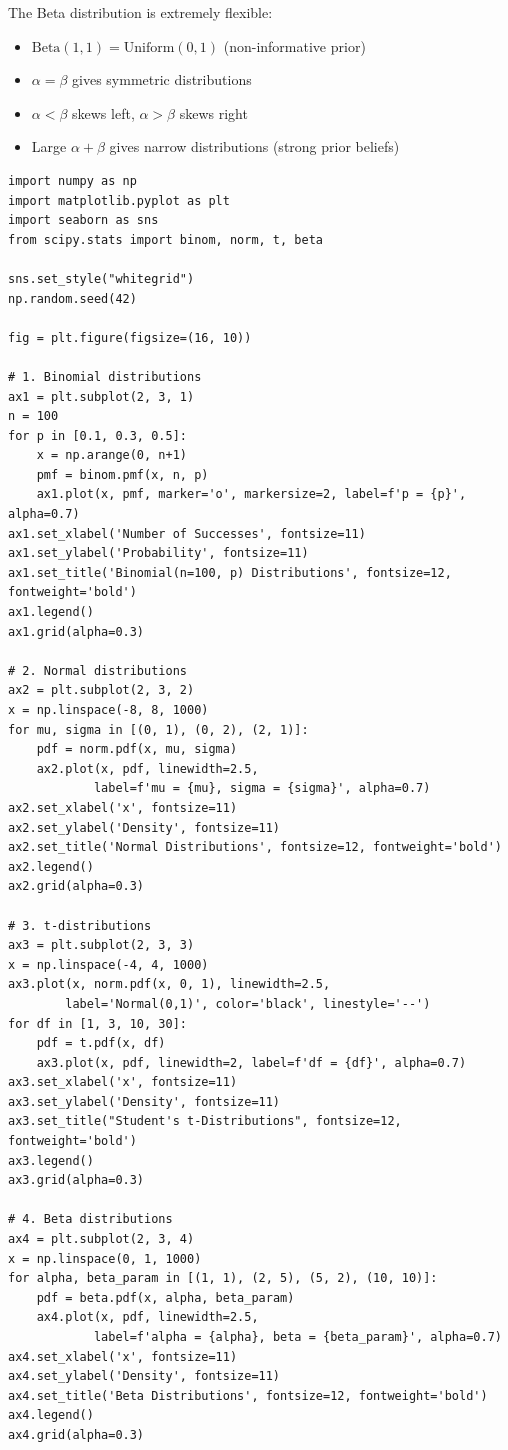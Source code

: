 The Beta distribution is extremely flexible:
\begin{itemize}
    \item $\text{Beta}(1,1) = \text{Uniform}(0,1)$ (non-informative prior)
    \item $\alpha = \beta$ gives symmetric distributions
    \item $\alpha < \beta$ skews left, $\alpha > \beta$ skews right
    \item Large $\alpha + \beta$ gives narrow distributions (strong prior beliefs)
\end{itemize}

\lstset{language=Python, caption=Visualizing Key Distributions, label=lst:distributions_viz}
\begin{lstlisting}
import numpy as np
import matplotlib.pyplot as plt
import seaborn as sns
from scipy.stats import binom, norm, t, beta

sns.set_style("whitegrid")
np.random.seed(42)

fig = plt.figure(figsize=(16, 10))

# 1. Binomial distributions
ax1 = plt.subplot(2, 3, 1)
n = 100
for p in [0.1, 0.3, 0.5]:
    x = np.arange(0, n+1)
    pmf = binom.pmf(x, n, p)
    ax1.plot(x, pmf, marker='o', markersize=2, label=f'p = {p}', alpha=0.7)
ax1.set_xlabel('Number of Successes', fontsize=11)
ax1.set_ylabel('Probability', fontsize=11)
ax1.set_title('Binomial(n=100, p) Distributions', fontsize=12, fontweight='bold')
ax1.legend()
ax1.grid(alpha=0.3)

# 2. Normal distributions
ax2 = plt.subplot(2, 3, 2)
x = np.linspace(-8, 8, 1000)
for mu, sigma in [(0, 1), (0, 2), (2, 1)]:
    pdf = norm.pdf(x, mu, sigma)
    ax2.plot(x, pdf, linewidth=2.5,
            label=f'mu = {mu}, sigma = {sigma}', alpha=0.7)
ax2.set_xlabel('x', fontsize=11)
ax2.set_ylabel('Density', fontsize=11)
ax2.set_title('Normal Distributions', fontsize=12, fontweight='bold')
ax2.legend()
ax2.grid(alpha=0.3)

# 3. t-distributions
ax3 = plt.subplot(2, 3, 3)
x = np.linspace(-4, 4, 1000)
ax3.plot(x, norm.pdf(x, 0, 1), linewidth=2.5,
        label='Normal(0,1)', color='black', linestyle='--')
for df in [1, 3, 10, 30]:
    pdf = t.pdf(x, df)
    ax3.plot(x, pdf, linewidth=2, label=f'df = {df}', alpha=0.7)
ax3.set_xlabel('x', fontsize=11)
ax3.set_ylabel('Density', fontsize=11)
ax3.set_title("Student's t-Distributions", fontsize=12, fontweight='bold')
ax3.legend()
ax3.grid(alpha=0.3)

# 4. Beta distributions
ax4 = plt.subplot(2, 3, 4)
x = np.linspace(0, 1, 1000)
for alpha, beta_param in [(1, 1), (2, 5), (5, 2), (10, 10)]:
    pdf = beta.pdf(x, alpha, beta_param)
    ax4.plot(x, pdf, linewidth=2.5,
            label=f'alpha = {alpha}, beta = {beta_param}', alpha=0.7)
ax4.set_xlabel('x', fontsize=11)
ax4.set_ylabel('Density', fontsize=11)
ax4.set_title('Beta Distributions', fontsize=12, fontweight='bold')
ax4.legend()
ax4.grid(alpha=0.3)


\end{lstlisting}
